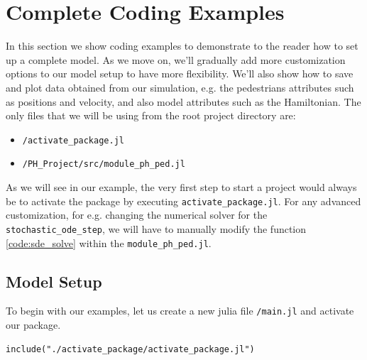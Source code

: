 \section{Complete Coding Examples}
In this section we show coding examples to demonstrate to the reader how to set up a complete model. As we move on, we'll gradually add more customization options to our model setup to have more flexibility. We'll also show how to save and plot data obtained from our simulation, e.g. the pedestrians attributes such as positions and velocity, and also model attributes such as the Hamiltonian. The only files that we will be using from the root project directory are:
\begin{itemize}
    \item \texttt{/activate\_package.jl}
    \item \texttt{/PH\_Project/src/module\_ph\_ped.jl}
\end{itemize}
As we will see in our example, the very first step to start a project would always be to activate the package by executing \texttt{activate\_package.jl}. For any advanced customization, for e.g. changing the numerical solver for the \texttt{stochastic\_ode\_step}, we will have to manually modify the function \autoref{code:sde_solve} within the \texttt{module\_ph\_ped.jl}.

\subsection{Model Setup}
To begin with our examples, let us create a new julia file \texttt{/main.jl} and activate our package.

\begin{listing}[H]
\begin{verbatim}
include("./activate_package/activate_package.jl")
\end{verbatim}
\end{listing}

